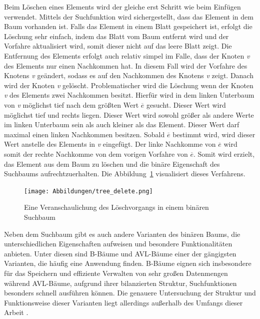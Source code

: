 Beim Löschen eines Elements wird der gleiche erst Schritt wie beim Einfügen verwendet. Mittels der Suchfunktion wird sichergestellt, dass das Element in dem Baum vorhanden ist. Falls das Element in einem Blatt gespeichert ist, erfolgt die Löschung sehr einfach, indem das Blatt vom Baum entfernt wird und der Vorfahre aktualisiert wird, somit dieser nicht auf das leere Blatt zeigt. Die Entfernung des Elements erfolgt auch relativ simpel im Falle, dass der Knoten \textit{v} des Elements nur einen Nachkommen hat. In diesem Fall wird der Vorfahre des Knotens \textit{v} geändert, sodass es auf den Nachkommen des Knotens \textit{v} zeigt. Danach wird der Knoten \textit{v} gelöscht. Problematischer wird die Löschung wenn der Knoten \textit{v} des Elements zwei Nachkommen besitzt. Hierfür wird in dem linken Unterbaum von \textit{v} möglichst tief nach dem größten Wert \textit{$\overline{e}$} gesucht. Dieser Wert wird möglichst tief und rechts liegen. Dieser Wert wird sowohl größer als andere Werte im linken Unterbaum sein als auch kleiner als das Element. Dieser Wert darf maximal einen linken Nachkommen besitzen. Sobald \textit{$\overline{e}$} bestimmt wird, wird dieser Wert anstelle des Elements in \textit{v} eingefügt. Der linke Nachkomme von \textit{$\overline{e}$} wird somit der rechte Nachkomme von dem vorigen Vorfahre von \textit{$\overline{e}$}. Somit wird erzielt, das Element aus dem Baum zu löschen und die binäre Eigenschaft des Suchbaums aufrechtzuerhalten. Die Abbildung~\ref{fig: tree_delete} visualisiert dieses Verfahrens. \autocite[140-141]{knebl_algorithmen_2021}

\begin{figure}[!b]
	\texttt{[image: Abbildungen/tree\_delete.png]}
	\centering
	\caption[Löschvorgang binären Baums]{Eine Veranschaulichung des Löschvorgangs in einem binären Suchbaum \autocite[140]{knebl_algorithmen_2021}}
	\label{fig: tree_delete}
\end{figure}

Neben dem Suchbaum gibt es auch andere Varianten des binären Baums, die unterschiedlichen Eigenschaften aufweisen und besondere Funktionalitäten anbieten. Unter diesen sind B-Bäume und AVL-Bäume einer der gängigsten Varianten, die häufig eine Anwendung finden. B-Bäume eignen sich insbesondere für das Speichern und effiziente Verwalten von sehr großen Datenmengen während AVL-Bäume, aufgrund ihrer bilanzierten Struktur, Suchfunktionen besonders schnell ausführen können. Die genauere Untersuchung der Struktur und Funktionsweise dieser Varianten liegt allerdings außerhalb des Umfangs dieser Arbeit \autocite[407-412]{gumm_band_2016}.

